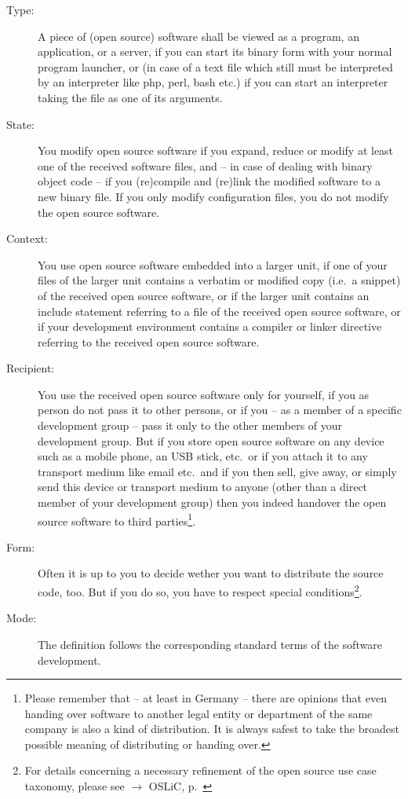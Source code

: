 \begin{description}
\item[Type:] A piece of (open source) software shall be viewed as a program, an
application, or a server, if you can start its binary form with your normal
program launcher, or (in case of a text file which still must be interpreted by
an interpreter like php, perl, bash etc.) if you can start an interpreter taking
the file as one of its arguments. \item[State:] You modify open source software
if you expand, reduce or modify at least one of the received software files, and
-- in case of dealing with binary object code -- if you (re)compile and (re)link
the modified software to a new binary file. If you only modify configuration
files, you do not modify the open source software.
\item[Context:] You use open source software embedded into a larger unit, if one
of your files of the larger unit contains a verbatim or modified copy (i.e.\ a
snippet) of the received open source software, or if the larger unit contains an
include statement referring to a file of the received open source software, or
if your development environment contains a compiler or linker directive
referring to the received open source software.
\item[Recipient:] You use the received open source software only for yourself, if
you as person do not pass it to other persons, or if you -- as a member of a
specific development group -- pass it only to the other members of your
development group. But if you store open source software on any device such as a
mobile phone, an USB stick, etc.\ or if you attach it to any transport
medium like email etc.\ and if you then sell, give away, or simply send this
device or transport medium to anyone (other than a direct member
of your development group) then you indeed handover the open source software to
third parties\footnote{Please remember that -- at least in Germany -- there are
opinions that even handing over software to another legal entity or department
of the same company is also a kind of distribution. It is always safest
to take the broadest possible meaning of distributing or handing over.}.
\item[Form:] Often it is up to you to decide wether you want to distribute the
source code, too. But if you do so, you have to respect special
conditions\footnote{For details concerning a necessary refinement of the open
source use case taxonomy, please see $\rightarrow$ OSLiC, p.\
\pageref{sec:SourceBinaryDifference}}.
\item[Mode:] The definition follows the corresponding standard terms of the
software development.
\end{description}

